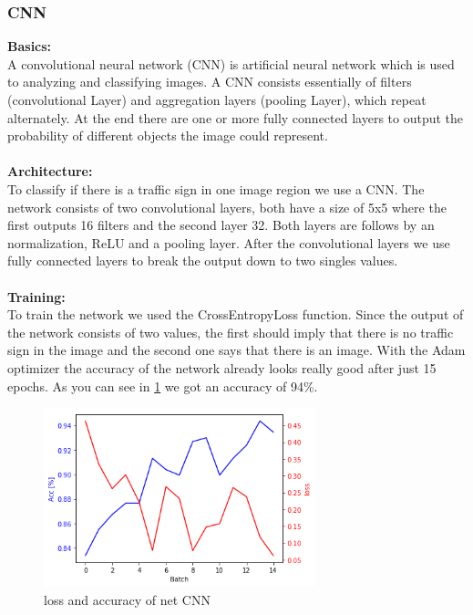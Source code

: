 \documentclass[12pt,a4paper,bibliography=totocnumbered,listof=totocnumbered]{scrartcl}
\begin{document}
\subsubsection{CNN}

\textbf{Basics:}\\
A convolutional neural network (CNN) is artificial neural network which is used to analyzing and classifying images. A CNN consists essentially of filters (convolutional Layer) and aggregation layers (pooling Layer), which repeat alternately. At the end there are one or more fully connected layers to output the probability of different objects the image could represent.\\\\

\textbf{Architecture:}\\
To classify if there is a traffic sign in one image region we use a CNN. The network consists of two convolutional layers, both have a size of 5x5 where the first outputs 16 filters and the second layer 32. Both layers are follows by an normalization, ReLU and a pooling layer. After the convolutional layers we use fully connected layers to break the output down to two singles values.\\\\

\textbf{Training:}\\
To train the network we used the CrossEntropyLoss function. Since the output of the network consists of two values, the first should imply that there is no traffic sign in the image and the second one says that there is an image. With the Adam optimizer the accuracy of the network already looks really good after just 15 epochs. As you can see in \ref{fig:loss_acc} we got an accuracy of 94\%.

\begin{figure}[htbp] 
  \centering
     \includegraphics[width=0.7\textwidth]{loss_acc}
  \caption{loss and accuracy of net CNN}
  \label{fig:loss_acc}
\end{figure}
\end{document}

